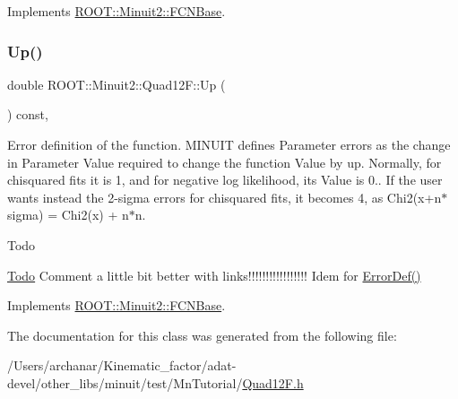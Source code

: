 Implements \mbox{\hyperlink{classROOT_1_1Minuit2_1_1FCNBase_a04ef08ddad92ce8d89d498efbe021c39}{R\+O\+O\+T\+::\+Minuit2\+::\+F\+C\+N\+Base}}.

\mbox{\label{classROOT_1_1Minuit2_1_1Quad12F_afbb216349fbceafc530845fe1cff5af4}} 
\subsubsection{\texorpdfstring{Up()}{Up()}\hspace{0.1cm}{\footnotesize\ttfamily [2/2]}}
{\footnotesize\ttfamily double R\+O\+O\+T\+::\+Minuit2\+::\+Quad12\+F\+::\+Up (\begin{DoxyParamCaption}{ }\end{DoxyParamCaption}) const\hspace{0.3cm}{\ttfamily [inline]}, {\ttfamily [virtual]}}

Error definition of the function. M\+I\+N\+U\+IT defines Parameter errors as the change in Parameter Value required to change the function Value by up. Normally, for chisquared fits it is 1, and for negative log likelihood, its Value is 0.. If the user wants instead the 2-\/sigma errors for chisquared fits, it becomes 4, as Chi2(x+n$\ast$sigma) = Chi2(x) + n$\ast$n.

\begin{DoxyRefDesc}{Todo}
\item[\mbox{\hyperlink{todo__todo000001}{Todo}}]Comment a little bit better with links!!!!!!!!!!!!!!!!! Idem for \mbox{\hyperlink{classROOT_1_1Minuit2_1_1FCNBase_ac4592475c58a65b037ba97ab5f3cba10}{Error\+Def()}}\end{DoxyRefDesc}


Implements \mbox{\hyperlink{classROOT_1_1Minuit2_1_1FCNBase_a04ef08ddad92ce8d89d498efbe021c39}{R\+O\+O\+T\+::\+Minuit2\+::\+F\+C\+N\+Base}}.



The documentation for this class was generated from the following file\+:\begin{DoxyCompactItemize}
\item 
/\+Users/archanar/\+Kinematic\+\_\+factor/adat-\/devel/other\+\_\+libs/minuit/test/\+Mn\+Tutorial/\mbox{\hyperlink{adat-devel_2other__libs_2minuit_2test_2MnTutorial_2Quad12F_8h}{Quad12\+F.\+h}}\end{DoxyCompactItemize}
